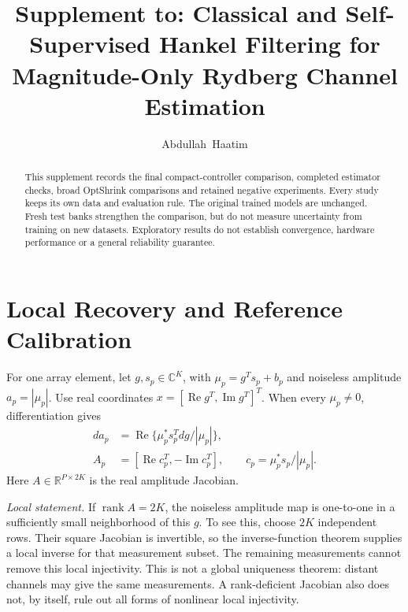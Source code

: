 \documentclass[journal]{IEEEtran}
\newcommand{\R}{\mathbb R}
\DeclareMathOperator{\rank}{rank}
\begin{document}
\title{Supplement to: Classical and Self-Supervised Hankel Filtering for Magnitude-Only Rydberg Channel Estimation}
\author{Abdullah~Haatim}
\maketitle
\begin{abstract}
This supplement records the final compact-controller comparison, completed
estimator checks, broad OptShrink comparisons and retained negative experiments. Every study keeps its own
data and evaluation rule. The original trained models are unchanged.
Fresh test banks strengthen the comparison, but do not measure uncertainty
from training on new datasets. Exploratory results do not establish
convergence, hardware performance or a general reliability guarantee.
\end{abstract}









\section{Local Recovery and Reference Calibration}
For one array element, let $g,s_p\in\mathbb C^K$, with
$\mu_p=g^Ts_p+b_p$ and noiseless amplitude $a_p=|\mu_p|$.
Use real coordinates $x=[\operatorname{Re}g^T,\operatorname{Im}g^T]^T$.
When every $\mu_p\ne0$, differentiation gives
\begin{align}
 da_p&=\operatorname{Re}\{\mu_p^*s_p^T dg/|\mu_p|\},\\
 A_p&=[\operatorname{Re}c_p^T,-\operatorname{Im}c_p^T],\qquad
 c_p=\mu_p^*s_p/|\mu_p|.
\end{align}
Here $A\in\R^{P\times2K}$ is the real amplitude Jacobian.

\textit{Local statement.} If $\rank A=2K$, the noiseless amplitude map
is one-to-one in a sufficiently small neighborhood of this $g$.
To see this, choose $2K$ independent rows. Their square Jacobian is
invertible, so the inverse-function theorem supplies a local inverse for
that measurement subset. The remaining measurements cannot remove this
local injectivity. This is not a global uniqueness theorem: distant
channels may give the same measurements. A rank-deficient Jacobian also
does not, by itself, rule out all forms of nonlinear local injectivity.
\end{document}

